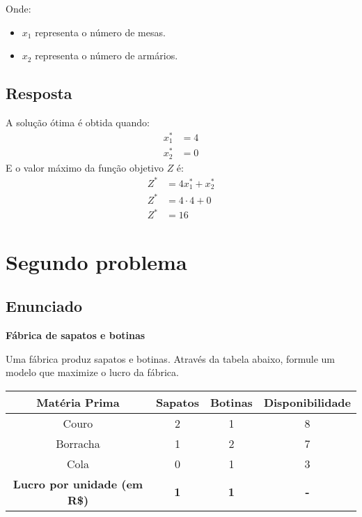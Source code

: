 \documentclass{article}
\begin{document}
Onde:
\begin{itemize}
    \item \(x_1\) representa o número de mesas.
    \item \(x_2\) representa o número de armários.
\end{itemize}

\subsection{Resposta}

\begin{tcolorbox}[colback=blue!5!white, colframe=blue!75!black, title=Resultado]
A solução ótima é obtida quando:
\begin{align*}
    x_1^* &= 4 \\
    x_2^* &= 0
\end{align*}
E o valor máximo da função objetivo \(Z\) é:
\begin{align*}
    Z^* &= 4x_1^* + x_2^* \\
    Z^* &= 4 \cdot 4 + 0 \\
    Z^* &= 16
\end{align*}
\end{tcolorbox}

\section{Segundo problema}

\subsection{Enunciado}

\begin{mdframed}[backgroundcolor=yellow!10, linecolor=black, linewidth=2pt]
\textbf{Fábrica de sapatos e botinas}

Uma fábrica produz sapatos e botinas. Através da tabela abaixo, formule um modelo que maximize o lucro da fábrica.
\end{mdframed}

\begin{center}
\begin{tabular}{|c|c|c|c|}
\hline
\textbf{Matéria Prima} & \textbf{Sapatos} & \textbf{Botinas} & \textbf{Disponibilidade} \\
\hline
Couro & 2 & 1 & 8 \\
\hline
Borracha & 1 & 2 & 7 \\
\hline
Cola & 0 & 1 & 3 \\
\hline
\textbf{Lucro por unidade (em R\$)} & \textbf{1} & \textbf{1} & \textbf{-} \\
\hline
\end{tabular}
\end{center}
\end{document}
